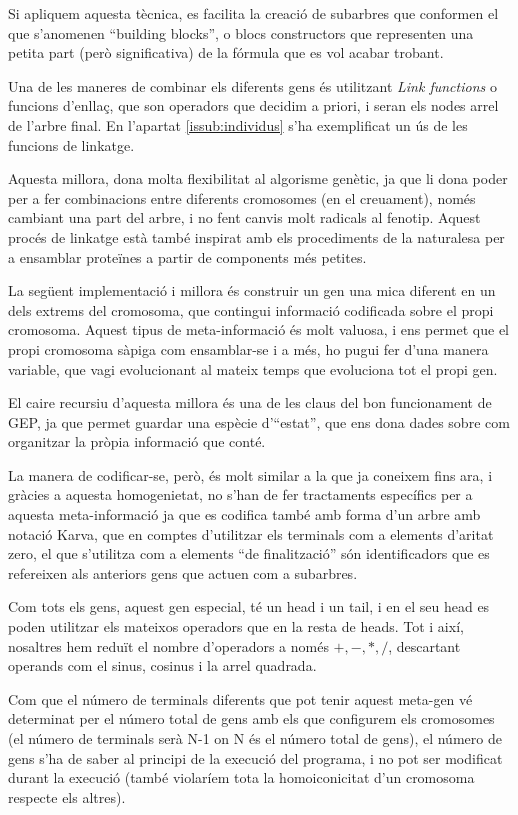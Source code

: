 Si apliquem aquesta tècnica, es facilita la creació de subarbres que conformen
el que s'anomenen ``building blocks'', o blocs constructors que representen una
petita part (però significativa) de la fórmula que es vol acabar trobant.


Una de les maneres de combinar els diferents gens és utilitzant \emph{Link
functions} o funcions d'enllaç, que son operadors que decidim a priori, i
seran els nodes arrel de l'arbre final.  En l'apartat \ref{issub:individus} s'ha
exemplificat un ús de les funcions de linkatge.

Aquesta millora, dona molta flexibilitat al algorisme genètic, ja que li dona
poder per a fer combinacions entre diferents cromosomes (en el creuament), només
cambiant una part del arbre, i no fent canvis molt radicals al fenotip.  Aquest
procés de linkatge està també inspirat amb els procediments de la naturalesa per
a ensamblar proteïnes a partir de components més petites.

La següent implementació i millora és construir un gen una mica diferent en un
dels extrems del cromosoma, que contingui informació codificada sobre el propi
cromosoma.  Aquest tipus de meta-informació és molt valuosa, i ens permet que el
propi cromosoma sàpiga com ensamblar-se i a més, ho pugui fer d'una manera
variable, que vagi evolucionant al mateix temps que evoluciona tot el propi gen.

El caire recursiu d'aquesta millora és una de les claus del bon funcionament de
GEP, ja que permet guardar una espècie d'``estat'', que ens dona dades sobre com
organitzar la pròpia informació que conté.

La manera de codificar-se, però, és molt similar a la que ja coneixem fins ara,
i gràcies a aquesta homogenietat, no s'han de fer tractaments específics per a
aquesta meta-informació ja que es codifica també amb forma d'un arbre amb notació
Karva, que en comptes d'utilitzar els terminals com a elements d'aritat zero, el
que s'utilitza com a elements ``de finalització'' són identificadors que es
refereixen als anteriors gens que actuen com a subarbres.

Com tots els gens, aquest gen especial, té un head i un tail, i en el seu head
es poden utilitzar els mateixos operadors que en la resta de heads.  Tot i així,
nosaltres hem reduït el nombre d'operadors a només $+,-,*,/$, descartant
operands com el sinus, cosinus i la arrel quadrada.

Com que el número de terminals diferents que pot tenir aquest meta-gen vé
determinat per el número total de gens amb els que configurem els cromosomes (el
número de terminals serà N-1 on N és el número total de gens), el número de gens
s'ha de saber al principi de la execució del programa, i no pot ser modificat
durant la execució (també violaríem tota la homoiconicitat  d'un cromosoma respecte
els altres).

